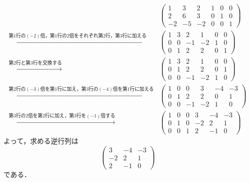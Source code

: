 \documentclass[uplatex,dvipdfmx,a4paper,10pt,fleqn]{jsarticle}
\begin{document}
\begin{tleftbar}
    \begin{align*} 
        &
        \left( 
            \begin{array}{ccc|ccc}
            1 & 3 & 2 & 1 & 0 & 0\\ 
            2 & 6 & 3 & 0 & 1 & 0 \\ 
            -2 & -5 & -2 & 0 & 0 & 1
            \end{array}
            \right) \\
           \xrightarrow{\text{第$1$行の$(-2)$倍，第$1$行の$2$倍をそれぞれ第$2$行，第$3$行に加える}} &
            \left( \begin{array}{ccc|ccc}
                1 & 3 & 2 & 1 & 0 & 0\\ 
                0 & 0 & -1 & -2 & 1 & 0 \\ 
                0 & 1 & 2 & 2 & 0 & 1
                \end{array}
                \right)\\
                \xrightarrow{\text{第$2$行と第$3$行を交換する}} &
                \left( \begin{array}{ccc|ccc}
                    1 & 3 & 2 & 1 & 0 & 0\\ 
                    0 & 1 & 2 & 2 & 0 & 1 \\
                    0 & 0 & -1 & -2 & 1 & 0 
                    \end{array}
                    \right)\\
                   \xrightarrow{\text{第$2$行の$(-3)$倍を第$1$行に加え，第$3$行の$(-4)$倍を第$1$行に加える}} &
                    \left( \begin{array}{ccc|ccc}
                    1 & 0 & 0 & 3 & -4 & -3\\ 
                    0 & 1 & 2 & 2 & 0 & 1 \\
                    0 & 0 & -1 & -2 & 1 & 0 
                        \end{array}
                        \right) \\
                        \xrightarrow{\text{第$3$行の$2$倍を第$2$行に加え，第$3$行を$(-1)$倍する}} &
                         \left( \begin{array}{ccc|ccc}
                            1 & 0 & 0 & 3 & -4 & -3\\ 
                            0 & 1 & 0 & -2 & 2 & 1 \\
                            0 & 0 & 1 & 2 & -1 & 0 
                             \end{array}
                             \right)
                            \end{align*}
        よって，求める逆行列は
        \[
            \begin{pmatrix} 
                3 & -4 & -3 \\
                -2 & 2 & 1 \\
                2 & -1 & 0 
            \end{pmatrix}
        \]
        である．
    \end{tleftbar}
\end{document}
